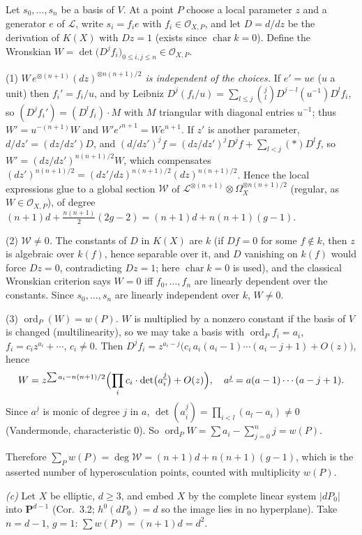 \documentclass[11pt]{article}
\begin{document}
Let $s_0,\dots,s_n$ be a basis of $V$. At a point $P$ choose a local parameter $z$ and a generator $e$ of $\mathcal L$, write $s_i=f_ie$ with $f_i\in\mathcal O_{X,P}$, and let $D=d/dz$ be the derivation of $K(X)$ with $Dz=1$ (exists since $\operatorname{char}k=0$). Define the Wronskian $W=\det\bigl(D^jf_i\bigr)_{0\le i,j\le n}\in\mathcal O_{X,P}$.

(1) \emph{$W\,e^{\otimes(n+1)}(dz)^{\otimes n(n+1)/2}$ is independent of the choices.} If $e'=ue$ ($u$ a unit) then $f_i'=f_i/u$, and by Leibniz $D^j(f_i/u)=\sum_{l\le j}\binom jlD^{j-l}(u^{-1})D^lf_i$, so $(D^jf_i')=(D^lf_i)\cdot M$ with $M$ triangular with diagonal entries $u^{-1}$; thus $W'=u^{-(n+1)}W$ and $W'e'^{n+1}=We^{n+1}$. If $z'$ is another parameter, $d/dz'=(dz/dz')D$, and $(d/dz')^jf=(dz/dz')^jD^jf+\sum_{l<j}(\ast)D^lf$, so $W'=(dz/dz')^{n(n+1)/2}W$, which compensates $(dz')^{n(n+1)/2}=(dz'/dz)^{n(n+1)/2}(dz)^{n(n+1)/2}$. Hence the local expressions glue to a global section $\mathcal W$ of $\mathcal L^{\otimes(n+1)}\otimes\Omega_X^{\otimes n(n+1)/2}$ (regular, as $W\in\mathcal O_{X,P}$), of degree $(n+1)d+\frac{n(n+1)}2(2g-2)=(n+1)d+n(n+1)(g-1)$.

(2) \emph{$\mathcal W\ne0$.} The constants of $D$ in $K(X)$ are $k$ (if $Df=0$ for some $f\notin k$, then $z$ is algebraic over $k(f)$, hence separable over it, and $D$ vanishing on $k(f)$ would force $Dz=0$, contradicting $Dz=1$; here $\operatorname{char}k=0$ is used), and the classical Wronskian criterion says $W=0$ iff $f_0,\dots,f_n$ are linearly dependent over the constants. Since $s_0,\dots,s_n$ are linearly independent over $k$, $W\ne0$.

(3) \emph{$\operatorname{ord}_P(W)=w(P)$.} $W$ is multiplied by a nonzero constant if the basis of $V$ is changed (multilinearity), so we may take a basis with $\operatorname{ord}_Pf_i=a_i$, $f_i=c_iz^{a_i}+\cdots$, $c_i\ne0$. Then $D^jf_i=z^{a_i-j}\bigl(c_i\,a_i(a_i-1)\cdots(a_i-j+1)+O(z)\bigr)$, hence
\[ W=z^{\sum a_i-n(n+1)/2}\Bigl(\prod_ic_i\cdot\det\bigl(a_i^{\underline j}\bigr)+O(z)\Bigr),\quad a^{\underline j}=a(a-1)\cdots(a-j+1). \]
Since $a^{\underline j}$ is monic of degree $j$ in $a$, $\det(a_i^{\underline j})=\prod_{i<l}(a_l-a_i)\ne0$ (Vandermonde, characteristic $0$). So $\operatorname{ord}_PW=\sum a_i-\sum_{j=0}^nj=w(P)$.

Therefore $\sum_Pw(P)=\deg\mathcal W=(n+1)d+n(n+1)(g-1)$, which is the asserted number of hyperosculation points, counted with multiplicity $w(P)$.

\emph{(c)} Let $X$ be elliptic, $d\ge3$, and embed $X$ by the complete linear system $|dP_0|$ into $\mathbf P^{d-1}$ (Cor.~3.2; $h^0(dP_0)=d$ so the image lies in no hyperplane). Take $n=d-1$, $g=1$: $\sum w(P)=(n+1)d=d^2$.
\end{document}
